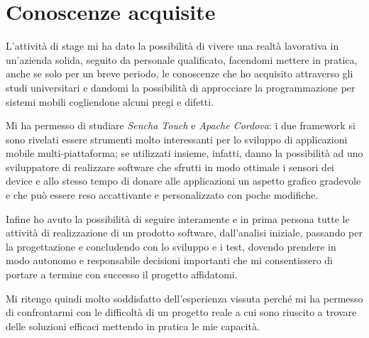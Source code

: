 \section{Conoscenze acquisite}
L'attività di stage mi ha dato la possibilità di vivere una realtà lavorativa in un'azienda solida, seguito da personale qualificato, facendomi mettere in pratica, anche se solo per un breve periodo, le conoscenze che ho acquisito attraverso gli studi universitari e dandomi la possibilità di approcciare la programmazione per sistemi mobili cogliendone alcuni pregi e difetti.

Mi ha permesso di studiare \emph{Sencha Touch} e \emph{Apache Cordova}: i due framework si sono rivelati essere strumenti molto interessanti per lo sviluppo di applicazioni mobile multi-piattaforma; se utilizzati insieme, infatti, danno la possibilità ad uno sviluppatore di realizzare software che sfrutti in modo ottimale i sensori dei device e allo stesso tempo  di donare alle applicazioni un aspetto grafico gradevole e che può essere reso accattivante e personalizzato con poche modifiche.

Infine ho avuto la possibilità di seguire interamente e in prima persona tutte le attività di realizzazione di un prodotto software, dall'analisi iniziale, passando per la progettazione e concludendo con lo sviluppo e i test, dovendo prendere in modo autonomo e responsabile decisioni importanti che mi consentissero di portare a termine con successo il progetto affidatomi.

Mi ritengo quindi molto soddisfatto dell'esperienza vissuta perché mi ha permesso di confrontarmi con le difficoltà di un progetto reale a cui sono riuscito a trovare delle soluzioni efficaci mettendo in pratica le mie capacità.